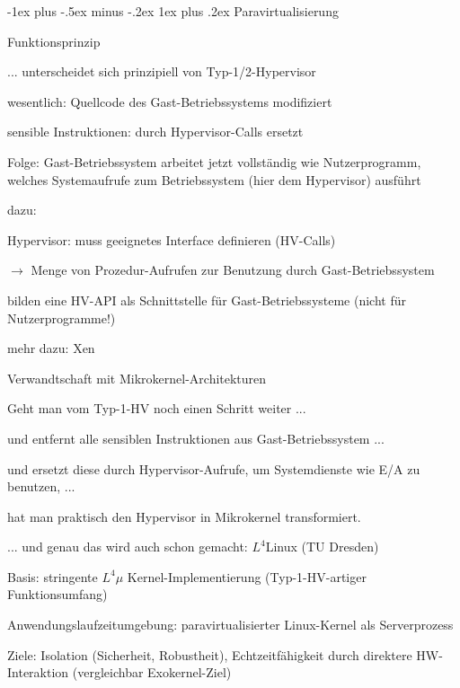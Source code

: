 \documentclass[a4paper]{article}
\makeatletter
\renewcommand{\subsubsection}{\@startsection{subsubsection}{3}{0mm}%
 {-1ex plus -.5ex minus -.2ex}%
 {1ex plus .2ex}%
 {\normalfont\small\bfseries}}
\makeatother
\begin{document}
\begin{multicols}{3}
    \subsubsection{Paravirtualisierung}

    Funktionsprinzip

    \begin{itemize*}
        \item ... unterscheidet sich prinzipiell von Typ-1/2-Hypervisor
        \item wesentlich: Quellcode des Gast-Betriebssystems modifiziert
        \item sensible Instruktionen: durch Hypervisor-Calls ersetzt
        \item Folge: Gast-Betriebssystem arbeitet jetzt vollständig wie
        Nutzerprogramm, welches Systemaufrufe zum Betriebssystem (hier dem
        Hypervisor) ausführt
        \item dazu:
        \begin{itemize*}
            \item Hypervisor: muss geeignetes Interface definieren (HV-Calls)
            \item[$\rightarrow$] Menge von Prozedur-Aufrufen zur Benutzung durch Gast-Betriebssystem
            \item bilden eine HV-API als Schnittstelle für Gast-Betriebssysteme (nicht für Nutzerprogramme!)
        \end{itemize*}
        \item mehr dazu: Xen
    \end{itemize*}

    Verwandtschaft mit Mikrokernel-Architekturen

    \begin{itemize*}
        \item Geht man vom Typ-1-HV noch einen Schritt weiter ...
        \begin{itemize*}
            \item und entfernt alle sensiblen Instruktionen aus Gast-Betriebssystem ...
            \item und ersetzt diese durch Hypervisor-Aufrufe, um Systemdienste wie E/A zu benutzen, ...
            \item hat man praktisch den Hypervisor in Mikrokernel transformiert.
        \end{itemize*}
        \item ... und genau das wird auch schon gemacht: $L^4$Linux (TU
        Dresden)
        \begin{itemize*}
            \item Basis: stringente $L^4\mu$ Kernel-Implementierung (Typ-1-HV-artiger Funktionsumfang)
            \item Anwendungslaufzeitumgebung: paravirtualisierter Linux-Kernel als Serverprozess
            \item Ziele: Isolation (Sicherheit, Robustheit), Echtzeitfähigkeit durch direktere HW-Interaktion (vergleichbar Exokernel-Ziel)
        \end{itemize*}
    \end{itemize*}


\end{multicols}
\end{document}
